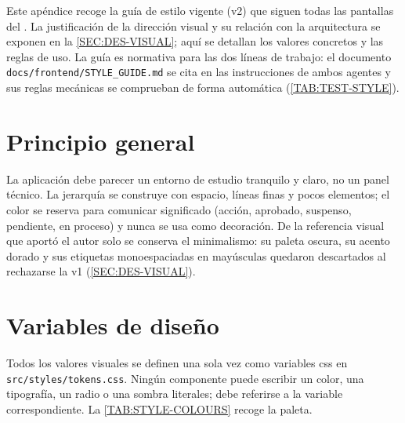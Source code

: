 
Este apéndice recoge la guía de estilo vigente (v2) que siguen todas las pantallas
del . La justificación de la dirección visual y su relación con la
arquitectura se exponen en la \cref{SEC:DES-VISUAL}; aquí se detallan los valores
concretos y las reglas de uso. La guía es normativa para las dos líneas de trabajo:
el documento \texttt{docs/frontend/STYLE\_GUIDE.md} se cita en las instrucciones de
ambos agentes y sus reglas mecánicas se comprueban de forma automática
(\cref{TAB:TEST-STYLE}).

\section*{Principio general}

La aplicación debe parecer un entorno de estudio tranquilo y claro, no un panel
técnico. La jerarquía se construye con espacio, líneas finas y pocos elementos; el
color se reserva para comunicar significado (acción, aprobado, suspenso, pendiente,
en proceso) y nunca se usa como decoración. De la referencia visual que aportó el
autor solo se conserva el minimalismo: su paleta oscura, su acento dorado y sus
etiquetas monoespaciadas en mayúsculas quedaron descartados al rechazarse la v1
(\cref{SEC:DES-VISUAL}).

\section*{Variables de diseño}

Todos los valores visuales se definen una sola vez como variables \acs{css} en
\texttt{src/styles/tokens.css}. Ningún componente puede escribir un color, una
tipografía, un radio o una sombra literales; debe referirse a la variable
correspondiente. La \cref{TAB:STYLE-COLOURS} recoge la paleta.

